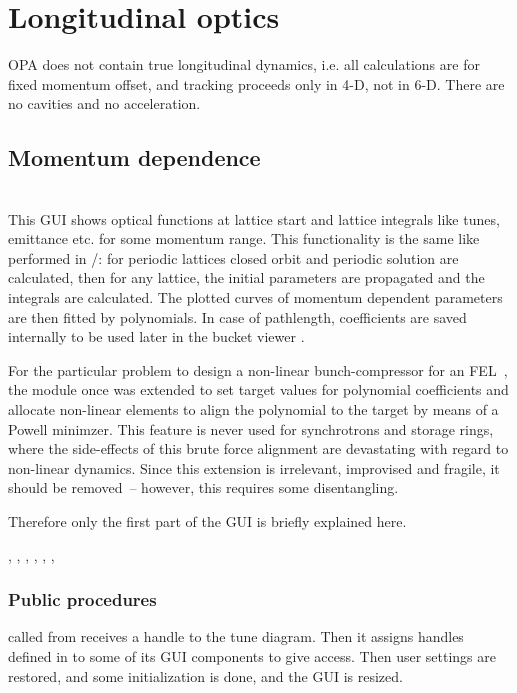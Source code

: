 \documentclass[12pt]{article}
\newcommand\code[1]{{\tt #1}}
\newcommand\guico[1]{{\color{blue}\code{#1}}}
\newcommand{\opagui}[1]{\colorbox{blue!20}{{\color{black}\code{#1}}}}
\newcommand{\oguih}[2]{\subsection{\label{#2}#1}{\Huge\opagui{#2}}\\}
\newcommand{\ogui}[1]{\hyperref[#1]{\opagui{#1}}}
\newcommand{\opaguif}[1]{\colorbox{violet!30}{{\color{black}\code{#1}}}}
\newcommand{\oguif}[1]{\hyperref[#1]{\opaguif{#1}}}
\newcommand{\opauni}[1]{\colorbox{orange!30}{{\color{black}\code{#1}}}}
\newcommand{\ouni}[1]{\hyperref[#1]{\opauni{#1}}}
\newcommand{\uses}[1]{\flushleft {\bf Uses:} #1}
\newcommand{\desc}[1]{#1}
\newcommand{\ppro}[1]{\subsubsection*{Public procedures} #1}
\newcommand{\todo}[1]{{\color{red} #1}}
\begin{document}
\section{\label{secmomo}Longitudinal optics}
OPA does not contain true longitudinal dynamics, i.e. all calculations are for fixed momentum offset, and tracking proceeds only in 4-D, not in 6-D. There are no cavities and no acceleration.


\oguih{Momentum dependence}{opamomentum}

\desc{This GUI shows optical functions at lattice start and lattice integrals like tunes, emittance etc. for some momentum range. This functionality is the same like performed in \ogui{opalinop}/\ouni{linoplib}: for periodic lattices closed orbit and periodic solution are calculated, then for any lattice, the initial parameters are propagated and the integrals are calculated. The plotted curves of momentum dependent parameters are then fitted by polynomials. In case of pathlength, coefficients are saved internally to be used later in the bucket viewer \ogui{opabucket}.

\todo{For the particular problem to design a non-linear bunch-compressor for an FEL~\cite{nlbuco}, the module once was extended to set target values for polynomial coefficients and allocate non-linear elements to align the polynomial to the target by means of a Powell minimzer. This feature is never used for synchrotrons and storage rings, where the side-effects of this brute force alignment are devastating with regard to non-linear dynamics. Since this extension is irrelevant, improvised and fragile, it should be removed~-- however, this requires some disentangling.}

Therefore only the first part of the GUI is briefly explained here.
}

\uses{\ouni{momentumlib}, \ouni{linoplib}, \ogui{opatunediag}, \ouni{globlib}, \ouni{mathlib}, \oguif{comfigureframe}, \ouni{comauxlib}} 

\ppro{
\guico{Start} called from \ogui{opamenu} receives a handle to the tune diagram. Then it assigns handles defined in \ouni{momentumlib} to some of its GUI components to give \ouni{momentumlib} access. Then user settings are restored, and some initialization is done, and the GUI is resized.
}
\end{document}
